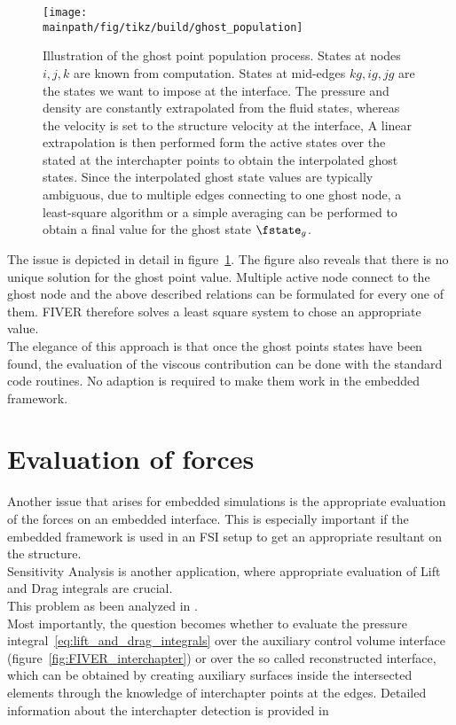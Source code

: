 \documentclass[../main.tex]{subfiles}
\begin{document}
\begin{figure}[h!]
	\begin{center}
        \texttt{[image: \\mainpath/fig/tikz/build/ghost\_population]}
        \caption[Ghost Point population]{Illustration of the ghost point population process. States at nodes $i,j,k$ are known from computation. States at mid-edges $kg,ig,jg$ are the states we want to impose at the interface. The pressure and density are constantly extrapolated from the fluid states, whereas the velocity is set to the structure  velocity at the interface, A linear extrapolation is then performed form the active states over the stated at the interchapter points to obtain the interpolated ghost states. Since the interpolated ghost state values are typically ambiguous, due to multiple edges connecting to one ghost node, a least-square algorithm or a simple averaging can be performed to obtain a final value for the ghost state $\fstate_g$.}
		\label{fig:ghost_population}
    \end{center}
\end{figure}


The issue is depicted in detail in figure~\ref{fig:ghost_population}.
The figure also reveals that there is no unique solution for the ghost point value. Multiple active node connect to the ghost node and the above described relations can be formulated for every one of them. \ac{FIVER} therefore solves a least square system to chose an appropriate value.\\
The elegance of this approach is that once the ghost points states have been found, the evaluation of the viscous contribution can be done with the standard code routines. No adaption is required to make them work in the embedded framework.


\section{Evaluation of forces}\label{sec:fiver_force_evaluation}
Another issue that arises for embedded simulations is the appropriate evaluation of the forces on an embedded interface. This is especially important if the embedded framework is used in an \ac{FSI} setup to get an appropriate resultant on the structure.\\
Sensitivity Analysis is another application, where appropriate evaluation of Lift and Drag integrals are crucial.\\
This problem as been analyzed in \cite{Wang2011}\cite{Wang2012}.\\
Most importantly, the question becomes whether to evaluate the pressure integral~\eqref{eq:lift_and_drag_integrals} over the auxiliary control volume interface (figure~\ref{fig:FIVER_interchapter}) or over the so called reconstructed interface, which can be obtained by creating auxiliary surfaces inside the intersected elements through the knowledge of interchapter points at the edges. Detailed information about the interchapter detection is provided in \cite{Wang2011a}
\end{document}
